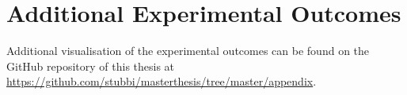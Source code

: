 \documentclass{cukthesis} %
\begin{document}


   








\tableofcontents 

\printglossaries 
\listoffigures 

\listofalgorithms
  
\cleardoublepage
{}












\appendix
\chapter{Additional Experimental Outcomes}
Additional visualisation of the experimental outcomes can be found on the GitHub repository of this thesis at \url{https://github.com/stubbi/masterthesis/tree/master/appendix}.
\end{document}
